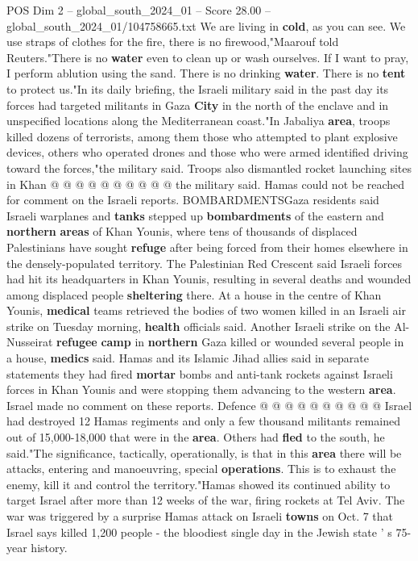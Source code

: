 \begin{textsample}{POS Dim 2 – global\_south\_2024\_01 – Score 28.00 – global\_south\_2024\_01/104758665.txt}
We are living in \textbf{cold}, as you can see.
We use straps of clothes for the fire, there is no firewood,"Maarouf told Reuters."There is no \textbf{water} even to clean up or wash ourselves.
If I want to pray, I perform ablution using the sand.
There is no drinking \textbf{water}.
There is no \textbf{tent} to protect us."In its daily briefing, the Israeli military said in the past day its forces had targeted militants in Gaza \textbf{City} in the north of the enclave and in unspecified locations along the Mediterranean coast."In Jabaliya \textbf{area}, troops killed dozens of terrorists, among them those who attempted to plant explosive devices, others who operated drones and those who were armed identified driving toward the forces,"the military said.
Troops also dismantled rocket launching sites in Khan @ @ @ @ @ @ @ @ @ @ the military said.
Hamas could not be reached for comment on the Israeli reports.
BOMBARDMENTSGaza residents said Israeli warplanes and \textbf{tanks} stepped up \textbf{bombardments} of the eastern and \textbf{northern} \textbf{areas} of Khan Younis, where tens of thousands of displaced Palestinians have sought \textbf{refuge} after being forced from their homes elsewhere in the densely-populated territory.
The Palestinian Red Crescent said Israeli forces had hit its headquarters in Khan Younis, resulting in several deaths and wounded among displaced people \textbf{sheltering} there.
At a house in the centre of Khan Younis, \textbf{medical} teams retrieved the bodies of two women killed in an Israeli air strike on Tuesday morning, \textbf{health} officials said.
Another Israeli strike on the Al-Nusseirat \textbf{refugee} \textbf{camp} in \textbf{northern} Gaza killed or wounded several people in a house, \textbf{medics} said.
Hamas and its Islamic Jihad allies said in separate statements they had fired \textbf{mortar} bombs and anti-tank rockets against Israeli forces in Khan Younis and were stopping them advancing to the western \textbf{area}.
Israel made no comment on these reports.
Defence @ @ @ @ @ @ @ @ @ @ Israel had destroyed 12 Hamas regiments and only a few thousand militants remained out of 15,000-18,000 that were in the \textbf{area}.
Others had \textbf{fled} to the south, he said."The significance, tactically, operationally, is that in this \textbf{area} there will be attacks, entering and manoeuvring, special \textbf{operations}.
This is to exhaust the enemy, kill it and control the territory."Hamas showed its continued ability to target Israel after more than 12 weeks of the war, firing rockets at Tel Aviv.
The war was triggered by a surprise Hamas attack on Israeli \textbf{towns} on Oct. 7 that Israel says killed 1,200 people - the bloodiest single day in the Jewish state ' s 75-year history.

\end{textsample}
